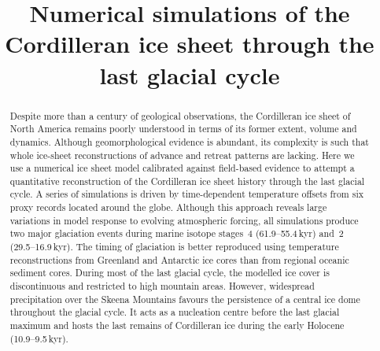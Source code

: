 \documentclass[tc, manuscript]{copernicus}
\begin{document}
\linenumbers

\title{Numerical simulations of the Cordilleran ice sheet
       through the last glacial cycle}




\received{}
\pubdiscuss{}
\revised{}
\accepted{}
\published{}

\maketitle

\begin{abstract}

  Despite more than a century of geological observations, the Cordilleran ice
  sheet of North America remains poorly understood in terms of its former
  extent, volume and dynamics. Although geomorphological evidence is abundant,
  its complexity is such that whole ice-sheet reconstructions of advance and
  retreat patterns are lacking. Here we use a numerical ice sheet model
  calibrated against field-based evidence to attempt a quantitative
  reconstruction of the Cordilleran ice sheet history through the last glacial
  cycle. A series of simulations is driven by time-dependent temperature
  offsets from six proxy records located around the globe. Although this
  approach reveals large variations in model response to evolving atmospheric
  forcing, all simulations produce two major glaciation events during
  marine isotope stages~4 (61.9--55.4\,kyr) and~2
  (29.5--16.9\,kyr). The timing of glaciation is
  better reproduced using temperature reconstructions from Greenland and
  Antarctic ice cores than from regional oceanic sediment cores. During most of
  the last glacial cycle, the modelled ice cover is discontinuous and
  restricted to high mountain areas. However, widespread precipitation over the
  Skeena Mountains favours the persistence of a central ice dome throughout the
  glacial cycle. It acts as a nucleation centre before the last glacial maximum
  and hosts the last remains of Cordilleran ice during the
  early Holocene (10.9--9.5\,kyr).

\end{abstract}
\end{document}

